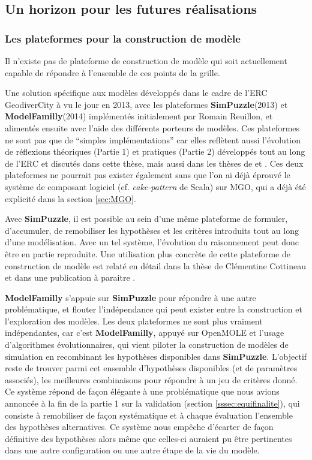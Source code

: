 \subsection{Un horizon pour les futures réalisations}

\subsubsection{Les plateformes pour la construction de modèle}

Il n'existe pas de plateforme de construction de modèle qui soit actuellement capable de répondre à l'ensemble de ces points de la grille. 

Une solution spécifique aux modèles développés dans le cadre de l'ERC GeodiverCity à vu le jour en 2013, avec les plateformes \textbf{SimPuzzle}(2013) et \textbf{ModelFamilly}(2014) implémentés initialement par Romain Reuillon, et alimentés ensuite avec l'aide des différents porteurs de modèles. Ces plateformes ne sont pas que de \enquote{simples implémentations} car elles reflètent aussi l'évolution de réflexions théoriques (Partie 1) et pratiques (Partie 2) développés tout au long de l'ERC et discutés dans cette thèse, mais aussi dans les thèses de \textcite{Schmitt2014} et \textcites{Cottineau2014b,Cottineau2015}. Ces deux plateformes ne pourrait pas exister également sans que l'on ai déjà éprouvé le système de composant logiciel (cf. \textit{cake-pattern} de Scala) sur MGO, qui a déjà été explicité dans la section \ref{sec:MGO}. 

Avec \textbf{SimPuzzle}, il est possible au sein d'une même plateforme de formuler, d'accumuler, de remobiliser les hypothèses et les critères introduits tout au long d'une modélisation. Avec un tel système, l'évolution du raisonnement peut donc être en partie reproduite. Une utilisation plus concrète de cette plateforme de construction de modèle est relaté en détail dans la thèse de Clémentine Cottineau \autocite{Cottineau2014b} et dans une publication à paraitre \autocite{Cottineau2015}.

\textbf{ModelFamilly} s'appuie sur \textbf{SimPuzzle} pour répondre à une autre problématique, et flouter l'indépendance qui peut exister entre la construction et l'exploration des modèles. Les deux plateformes ne sont plus vraiment indépendantes, car c'est \textbf{ModelFamilly}, appuyé sur OpenMOLE et l'usage d'algorithmes évolutionnaires, qui vient piloter la construction de modèles de simulation en recombinant les hypothèses disponibles dans \textbf{SimPuzzle}. L'objectif reste de trouver parmi cet ensemble d'hypothèses disponibles (et de paramètres associés), les meilleures combinaisons pour répondre à un jeu de critères donné. Ce système répond de façon élégante à une problématique que nous avions annoncée à la fin de la partie 1 sur la validation (section \ref{sssec:equifinalite}), qui consiste à remobiliser de façon systématique et à chaque évaluation l'ensemble des hypothèses alternatives. Ce système nous empêche d'écarter de façon définitive des hypothèses alors même que celles-ci auraient pu être pertinentes dans une autre configuration ou une autre étape de la vie du modèle.     

